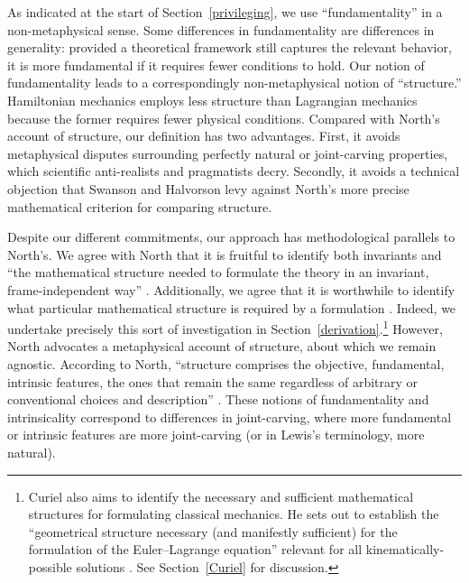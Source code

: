 \documentclass[12pt, twoside]{article}
\begin{document}
As indicated at the start of Section~\ref{privileging}, we use ``fundamentality'' in a non-metaphysical sense. Some differences in fundamentality are differences in generality: provided a theoretical framework still captures the relevant behavior, it is more fundamental if it requires fewer conditions to hold. Our notion of fundamentality leads to a correspondingly non-metaphysical notion of ``structure.'' Hamiltonian mechanics employs less structure than Lagrangian mechanics because the former requires fewer physical conditions. Compared with North's \parencites*[]{North} account of structure, our definition has two advantages. First, it avoids metaphysical disputes surrounding perfectly natural or joint-carving properties, which scientific anti-realists and pragmatists decry. Secondly, it avoids a technical objection that Swanson and Halvorson \parencites*[]{Swanson} levy against North's more precise mathematical criterion for comparing structure. 

Despite our different commitments, our approach has methodological parallels to North's. We agree with North that it is fruitful to identify both invariants and ``the mathematical structure needed to formulate the theory in an invariant, frame-independent way'' \parencites*[65]{North}. Additionally, we agree that it is worthwhile to identify what particular mathematical structure is required by a formulation \parencites[78]{North}. Indeed, we undertake precisely this sort of investigation in Section~\ref{derivation}.\footnote{Curiel also aims to identify the necessary and sufficient mathematical structures for formulating classical mechanics. He sets out to establish the ``geometrical structure necessary (and manifestly sufficient) for the formulation of the Euler--Lagrange equation'' relevant for all kinematically-possible solutions \parencites*[292]{Curiel}. See Section~\ref{Curiel} for discussion.} However, North advocates a metaphysical account of structure, about which we remain agnostic. According to North, ``structure comprises the objective, fundamental, intrinsic features, the ones that remain the same regardless of arbitrary or conventional choices and description'' \parencites*[66]{North}. These notions of fundamentality and intrinsicality correspond to differences in joint-carving, where more fundamental or intrinsic features are more joint-carving (or in Lewis's \parencites*[]{Lewis1983} terminology, more natural). 
\end{document}
